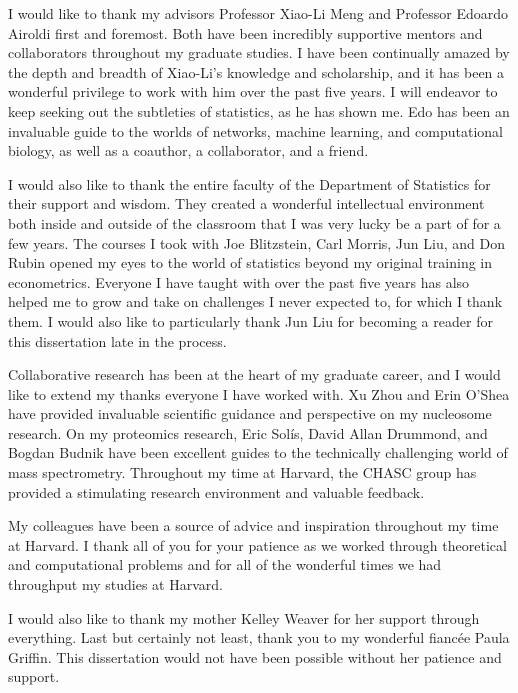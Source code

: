 
I would like to thank my advisors Professor Xiao-Li Meng and Professor Edoardo Airoldi first and foremost.
Both have been incredibly supportive mentors and collaborators throughout my graduate studies.
I have been continually amazed by the depth and breadth of Xiao-Li's knowledge and scholarship, and it has been a wonderful privilege to work with him over the past five years.
I will endeavor to keep seeking out the subtleties of statistics, as he has shown me.
Edo has been an invaluable guide to the worlds of networks, machine learning, and computational biology, as well as a coauthor, a collaborator, and a friend.

I would also like to thank the entire faculty of the Department of Statistics for their support and wisdom.
They created a wonderful intellectual environment both inside and outside of the classroom that I was very lucky be a part of for a few years.
The courses I took with Joe Blitzstein, Carl Morris, Jun Liu, and Don Rubin opened my eyes to the world of statistics beyond my original training in econometrics.
Everyone I have taught with over the past five years has also helped me to grow and take on challenges I never expected to, for which I thank them.
I would also like to particularly thank Jun Liu for becoming a reader for this dissertation late in the process.

Collaborative research has been at the heart of my graduate career, and I would like to extend my thanks everyone I have worked with.
Xu Zhou and Erin O'Shea have provided invaluable scientific guidance and perspective on my nucleosome research.
On my proteomics research, Eric Sol\'is, David Allan Drummond, and Bogdan Budnik have been excellent guides to the technically challenging world of mass spectrometry.
Throughout my time at Harvard, the CHASC group has provided a stimulating research environment and valuable feedback.

My colleagues have been a source of advice and inspiration throughout my time at Harvard.
I thank all of you for your patience as we worked through theoretical and computational problems and for all of the wonderful times we had throughput my studies at Harvard.

I would also like to thank my mother Kelley Weaver for her support through everything.
Last but certainly not least, thank you to my wonderful fianc\'ee Paula Griffin.
This dissertation would not have been possible without her patience and support.
